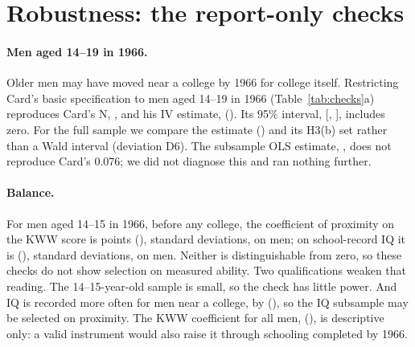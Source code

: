 \documentclass[11pt]{article}
\begin{document}
\section{Robustness: the report-only checks}
\label{sec:robust}



\paragraph{Men aged 14--19 in 1966.} Older men may have moved near a college by 1966 for
college itself. Restricting Card's basic specification to men aged 14--19 in 1966
(Table~\ref{tab:checks}a) reproduces Card's N, \YoungN{}, and his IV estimate,
\YoungIv{} (\YoungIvSe{}). Its 95\% interval, [\YoungIvLo, \YoungIvHi], includes zero. For
the full sample we compare the estimate \IvReturn{} (\IvReturnSe{}) and its H3(b) set rather
than a Wald interval (deviation D6). The subsample OLS estimate, \YoungOls{}, does not
reproduce Card's 0.076; we did not diagnose this and ran nothing further. %

\paragraph{Balance.} For men aged 14--15 in 1966, before any college, the coefficient of
proximity on the KWW score is \BalKwwYoung{} points (\BalKwwYoungSe{}), \BalKwwYoungSdu{}
standard deviations, on \BalKwwYoungN{} men; on school-record IQ it is \BalIq{}
(\BalIqSe{}), \BalIqSdu{} standard deviations, on \BalIqN{} men. Neither is distinguishable
from zero, so these checks do not show selection on measured ability. Two qualifications
weaken that reading. The 14--15-year-old sample is small, so the check has little power.
And IQ is recorded more often for men near a college, by \IqObsDiff{} (\IqObsDiffSe{}), so
the IQ subsample may be selected on proximity. The KWW coefficient for all men,
\BalKwwAll{} (\BalKwwAllSe{}), is descriptive only: a valid instrument would also raise it
through schooling completed by 1966.
\end{document}
